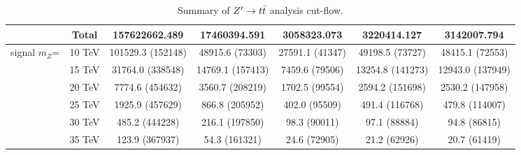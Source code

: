 \documentclass{cernrep}
\begin{document}
\begin{landscape}
\begin{table}[!htb]
{\begin{tabular}{|c|c|c|c|c|c|c|}
                & Total         & 157622662.489         & 17460394.591         & 3058323.073        & 3220414.127        & 3142007.794        \\
\hline
signal $m_{Z}$= & 10 TeV        & 101529.3 (152148)     & 48915.6 (73303)      & 27591.1 (41347)    & 49198.5 (73727)    & 48415.1 (72553)    \\
                & 15 TeV        & 31764.0 (338548)      & 14769.1 (157413)     & 7459.6 (79506)     & 13254.8 (141273)   & 12943.0 (137949)   \\
                & 20 TeV        & 7774.6 (454632)       & 3560.7 (208219)      & 1702.5 (99554)     & 2594.2 (151698)    & 2530.2 (147958)    \\
                & 25 TeV        & 1925.9 (457629)       & 866.8 (205952)       & 402.0 (95509)      & 491.4 (116768)     & 479.8 (114007)     \\
                & 30 TeV        & 485.2 (444228)        & 216.1 (197850)       & 98.3 (90011)       & 97.1 (88884)       & 94.8 (86815)       \\
                & 35 TeV        & 123.9 (367937)        & 54.3 (161321)        & 24.6 (72905)       & 21.2 (62926)       & 20.7 (61419)       \\
\hline
\hline
\end{tabular}}
\caption{Summary of $Z^{\prime} \rightarrow t\bar{t}$ analysis cut-flow.}
\label{tab:Zptt_cutflow}
\end{table}
\end{landscape}
\end{document}
